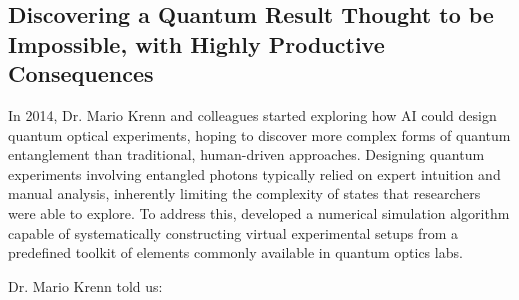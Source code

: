 \subsection{Discovering a Quantum Result Thought to be Impossible, with Highly Productive Consequences
~\citep{KrennEntangle2017}}
\label{sec:quantum}

In 2014, Dr. Mario Krenn and colleagues started exploring how AI could design quantum optical experiments, hoping to discover more complex forms of quantum entanglement than traditional, human-driven approaches.
Designing quantum experiments involving entangled photons typically relied on expert intuition and manual analysis, inherently limiting the complexity of states that researchers were able to explore.
To address this, \citet{autoQuantumKrenn2016} developed a numerical simulation algorithm capable of systematically constructing virtual experimental setups from a predefined toolkit of elements commonly available in quantum optics labs. 

Dr. Mario Krenn told us:

